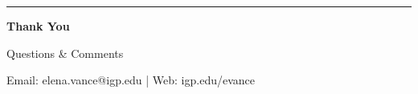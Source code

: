 \begin{frame}[plain,c]
  \centering
  \vfill
  {\color{cosmicgold}\rule{2cm}{1.5pt}}\par\vspace{0.6cm}
  {\color{cosmicnavy}\bfseries Thank You}\par
  \vspace{0.4cm}
  {\color{cosmicslate}\large Questions \& Comments}\par
  \vspace{1.5cm}
  {\fontsize{8pt}{10pt}\selectfont\color{cosmicslate} Email: elena.vance@igp.edu \quad | \quad Web: igp.edu/evance}
  \vfill
\end{frame}
